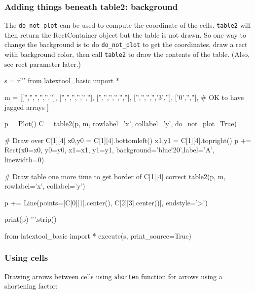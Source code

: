 \newpage
\subsubsection{Adding things beneath table2: background}

The \verb!do_not_plot! can be used to compute the coordinate of the cells.
\verb!table2! will then return the RectContainer object but the table is not drawn.
So one way to change the background is to do \verb!do_not_plot!
to get the coordinates, draw a rect with background color,
then call \verb!table2! to draw the contents of the table.
(Also, see rect parameter later.)
\begin{python}
s = r'''
from latextool_basic import *

m = [['','','','','',''],
     ['','','','','',''],
     ['','','','','',''],
     ['','','','','3',''],
     ['0','',''],           # OK to have jagged arrays
     ]

p = Plot()
C = table2(p, m, rowlabel='x', collabel='y', do_not_plot=True)

# Draw over C[1][4]
x0,y0 = C[1][4].bottomleft()
x1,y1 = C[1][4].topright()
p += Rect(x0=x0, y0=y0, x1=x1, y1=y1,
          background='blue!20',label='A', linewidth=0)

# Draw table one more time to get border of C[1][4] correct
table2(p, m, rowlabel='x', collabel='y')

p += Line(points=[C[0][1].center(), C[2][3].center()], endstyle='>')

print(p)
'''.strip()

from latextool_basic import *
execute(s, print_source=True)
\end{python}









\newpage
\subsubsection{Using cells}

Drawing arrows between cells using \texttt{shorten} function for arrows
using a shortening factor:

